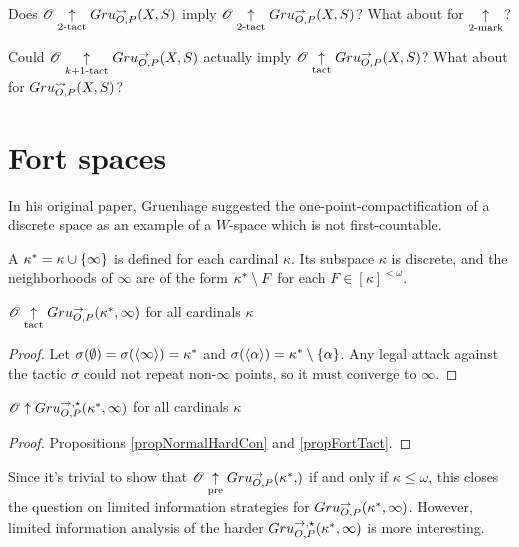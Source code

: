\begin{ques}
  Does $\mathscr{O} \underset{2\text{-tact}}{\uparrow} Gru_{O,P}^{\leadsto}(X,S)$ imply
  $\mathscr{O} \underset{2\text{-tact}}{\uparrow} Gru_{O,P}^{\to}(X,S)$? What about for $\underset{2\text{-mark}}{\uparrow}$?
\end{ques}

\begin{ques}
  Could $\mathscr{O} \underset{k+1\text{-tact}}{\uparrow} Gru_{O,P}^{\to}(X,S)$ actually imply
  $\mathscr{O} \underset{\text{tact}}{\uparrow} Gru_{O,P}^{\to}(X,S)$? What about for $Gru_{O,P}^{\leadsto}(X,S)$?
\end{ques}



\section{Fort spaces}

In his original paper, Gruenhage suggested the one-point-compactification of a
discrete space as an example of a $W$-space which is not first-countable.

\begin{defn}
  A  $\kappa^*=\kappa\cup\{\infty\}$ is defined
  for each cardinal $\kappa$. Its subspace $\kappa$ is discrete, and the
  neighborhoods of $\infty$ are of the form $\kappa^*\setminus F$
  for each $F\in[\kappa]^{<\omega}$.
\end{defn}

\begin{prop}\label{propFortTact}
  $\mathscr{O} \underset{\text{tact}}{\uparrow} Gru_{O,P}^{\to}(\kappa^*,\infty)$ for all cardinals $\kappa$
\end{prop}

\begin{proof}
  Let $\sigma(\emptyset)=\sigma(\langle\infty\rangle)=\kappa^*$ and
  $\sigma(\langle\alpha\rangle)=\kappa^*\setminus\{\alpha\}$. Any legal attack
  against the tactic $\sigma$ could not repeat non-$\infty$ points, so
  it must converge to $\infty$.
\end{proof}

\begin{cor}
  $\mathscr{O} \uparrow Gru_{O,P}^{\to,\star}(\kappa^*,\infty)$ for all cardinals $\kappa$
\end{cor}

\begin{proof}
  Propositions \ref{propNormalHardCon} and \ref{propFortTact}.
\end{proof}

Since it's trivial to show that $\pl O\prewin\gruConGame{\oneptcomp\kappa}$ if and
only if $\kappa\leq\omega$, this closes the question on limited information
strategies for $Gru_{O,P}^{\to}(\kappa^*,\infty)$. However, limited
information analysis of the harder $Gru_{O,P}^{\to,\star}(\kappa^*,\infty)$
is more interesting.

